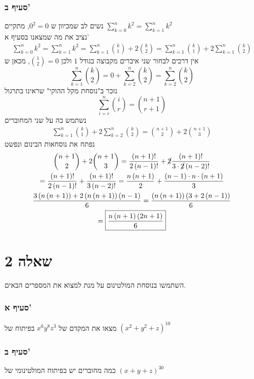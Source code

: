 \documentclass[12pt, titlepage]{article}
\begin{document}
\section*{סעיף ב'}
נשים לב שמכיוון ש $0^2 =0$, מתקיים $\sum_{k=0}^n k^2 = \sum_{k=1}^n k^2$\\
נציב את מה שמצאנו בסעיף א'
\begin{gather*}
    \sum_{k=0}^n k^2=   \sum_{k=1}^n k^2 =   \sum_{k=1}^n \binom{k}{1} + 2\binom{k}{2} = \sum_{k=1}^n \binom{k}{1} + 2\sum_{k=1}^n \binom{k}{2}
\end{gather*}
אין דרכים לבחור שני איברים מקבוצה בגודל $1$ ולכן $\binom{1}{2}=0$, מכאן ש
    \[
\sum_{k=1}^n \binom{k}{2}=0+\sum_{k=2}^n \binom{k}{2} = \sum_{k=2}^n\binom{k}{2}
\]
נזכר ב"נוסחת מקל ההוקי" שראינו בתרגול
\[
\sum_{i=r}^n \binom{i}{r} = \binom{n+1}{r+1}
\]
נשתמש בה על שני המחוברים
\begin{gather*}
    \sum_{k=1}^n \binom{k}{1} + 2\sum_{k=2}^n \binom{k}{2} = \binom{n+1}{2}+ 2\binom{n+1}{3}
\end{gather*}
נפתח את נוסחאות הבינום ונפשט
\begin{gather*}
    \binom{n+1}{2} + 2\binom{n+1}{3} = \frac{\left(n+1\right)!}{2\left(n-1\right)!} + \cancel{2}\frac{\left(n+1\right)!}{3\cdot\cancel{2}\left(n-2\right)!} \\
    =    \frac{\left(n+1\right)!}{2\left(n-1\right)!} + \frac{\left(n+1\right)!}{3\left(n-2\right)!} = \frac{n\left(n+1\right)}{2} + \frac{\left(n-1\right)\cdot n\cdot \left(n+1\right)}{3}\\
    \frac{3\left(n\left(n+1\right)\right)+2\left(n\left(n+1\right)\right)\left(n-1\right)}{6} = \frac{\left(n\left(n+1\right)\right)\left(3+2\left(n-1\right)\right)}{6}\\
    = \boxed{\frac{n\left(n+1\right)\left(2n+1\right)}{6}}
\end{gather*}
\newpage
\part*{שאלה 2}
השתמשו בנוסחת המולטינום על מנת למצוא את המספרים הבאים.
\section*{סעיף א'}
מצאו את המקדם של $x^6y^8z^3$ בפיתוח של $\left(x^2+y^2+z\right)^{10}$
\section*{סעיף ב'}
כמה מחוברים יש בפיתוח המולטינומי של $\left(x+y+z\right)^{30}$
\end{document}
